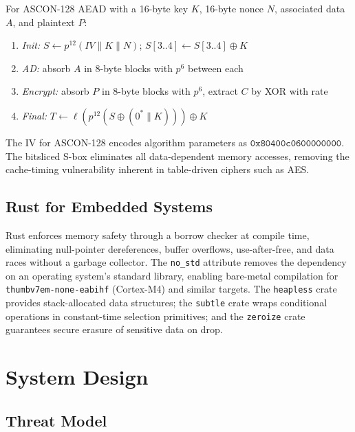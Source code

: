 \documentclass[conference]{IEEEtran}
\begin{document}
For ASCON-128 AEAD with a 16-byte key $K$, 16-byte nonce $N$, associated data
$A$, and plaintext $P$:
\begin{enumerate}
  \item \textit{Init:} $S \leftarrow p^{12}(\mathit{IV} \| K \| N)$;
        $S[3..4] \leftarrow S[3..4] \oplus K$
  \item \textit{AD:} absorb $A$ in 8-byte blocks with $p^{6}$ between each
  \item \textit{Encrypt:} absorb $P$ in 8-byte blocks with $p^{6}$, extract $C$
        by XOR with rate
  \item \textit{Final:} $T \leftarrow \ell(p^{12}(S \oplus (0^* \| K))) \oplus K$
\end{enumerate}

The IV for ASCON-128 encodes algorithm parameters as $\mathtt{0x80400c0600000000}$.
The bitsliced S-box eliminates all data-dependent memory accesses, removing
the cache-timing vulnerability inherent in table-driven ciphers such as AES.

\subsection{Rust for Embedded Systems}

Rust enforces memory safety through a borrow checker at compile time,
eliminating null-pointer dereferences, buffer overflows, use-after-free, and
data races without a garbage collector. The \texttt{no\_std} attribute removes
the dependency on an operating system's standard library, enabling bare-metal
compilation for \texttt{thumbv7em-none-eabihf} (Cortex-M4) and similar targets.
The \texttt{heapless} crate provides stack-allocated data structures; the
\texttt{subtle} crate wraps conditional operations in constant-time selection
primitives; and the \texttt{zeroize} crate guarantees secure erasure of
sensitive data on drop.

\section{System Design}
\label{sec:design}

\subsection{Threat Model}
\end{document}
